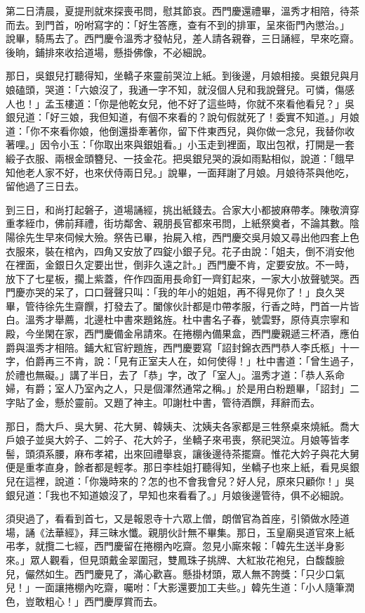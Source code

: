 第二日清晨，夏提刑就來探喪弔問，慰其節哀。西門慶還禮畢，溫秀才相陪，待茶而去。到門首，吩咐寫字的：「好生答應，查有不到的排軍，呈來衙門內懲治。」 說畢，騎馬去了。西門慶令溫秀才發帖兒，差人請各親眷，三日誦經，早來吃齋。後晌，鋪排來收拾道場，懸掛佛像，不必細說。

那日，吳銀兒打聽得知，坐轎子來靈前哭泣上紙。到後邊，月娘相接。吳銀兒與月娘磕頭，哭道：「六娘沒了，我通一字不知，就沒個人兒和我說聲兒。可憐，傷感人也！」孟玉樓道：「你是他乾女兒，他不好了這些時，你就不來看他看兒？」吳銀兒道：「好三娘，我但知道，有個不來看的？說句假就死了！委實不知道。」月娘道：「你不來看你娘，他倒還掛牽著你，留下件東西兒，與你做一念兒，我替你收著哩。」因令小玉：「你取出來與銀姐看。」小玉走到裡面，取出包袱，打開是一套緞子衣服、兩根金頭簪兒、一技金花。把吳銀兒哭的淚如雨點相似，說道：「餓早知他老人家不好，也來伏侍兩日兒。」說畢，一面拜謝了月娘。月娘待茶與他吃，留他過了三日去。

到三日，和尚打起磐子，道場誦經，挑出紙錢去。合家大小都披麻帶孝。陳敬濟穿重孝絰巾，佛前拜禮，街坊鄰舍、親朋長官都來弔問，上紙祭奠者，不論其數。陰陽徐先生早來伺候大殮。祭告已畢，抬屍入棺，西門慶交吳月娘又尋出他四套上色衣服來，裝在棺內，四角又安放了四錠小銀子兒。花子由說：「姐夫，倒不消安他在裡面，金銀日久定要出世，倒非久遠之計。」西門慶不肯，定要安放。不一時，放下了七星板，擱上紫蓋，仵作四面用長命釘一齊釘起來，一家大小放聲號哭。西門慶亦哭的呆了，口口聲聲只叫：「我的年小的姐姐，再不得見你了！」良久哭畢，管待徐先生齋饌，打發去了。闔傢伙計都是巾帶孝服，行香之時，門首一片皆白。溫秀才舉薦，北邊杜中書來題銘旌。杜中書名子春，號雲野，原侍真宗寧和殿，今坐閑在家，西門慶備金帛請來。在捲棚內備果盒，西門慶親遞三杯酒，應伯爵與溫秀才相陪。鋪大紅官紵題旌，西門慶要寫「詔封錦衣西門恭人李氏柩」十一字，伯爵再三不肯，說：「見有正室夫人在，如何使得！」杜中書道：「曾生過子，於禮也無礙。」講了半日，去了「恭」字，改了「室人」。溫秀才道：「恭人系命婦，有爵；室人乃室內之人，只是個渾然通常之稱。」於是用白粉題畢，「詔封」二字貼了金，懸於靈前。又題了神主。叩謝杜中書，管待酒饌，拜辭而去。

那日，喬大戶、吳大舅、花大舅、韓姨夫、沈姨夫各家都是三牲祭桌來燒紙。喬大戶娘子並吳大妗子、二妗子、花大妗子，坐轎子來弔喪，祭祀哭泣。月娘等皆孝髻，頭須系腰，麻布孝裙，出來回禮舉哀，讓後邊待茶擺齋。惟花大妗子與花大舅便是重孝直身，餘者都是輕孝。那日李桂姐打聽得知，坐轎子也來上紙，看見吳銀兒在這裡，說道：「你幾時來的？怎的也不會我會兒？好人兒，原來只顧你！」吳銀兒道：「我也不知道娘沒了，早知也來看看了。」月娘後邊管待，俱不必細說。

須臾過了，看看到首七，又是報恩寺十六眾上僧，朗僧官為首座，引領做水陸道場，誦《法華經》，拜三昧水懺。親朋伙計無不畢集。那日，玉皇廟吳道官來上紙弔孝，就攬二七經，西門慶留在捲棚內吃齋。忽見小廝來報：「韓先生送半身影來。」眾人觀看，但見頭戴金翠圍冠，雙鳳珠子挑牌、大紅妝花袍兒，白馥馥臉兒，儼然如生。西門慶見了，滿心歡喜。懸掛材頭，眾人無不誇獎：「只少口氣兒！」一面讓捲棚內吃齋，囑咐：「大影還要加工夫些。」韓先生道：「小人隨筆潤色，豈敢粗心！」西門慶厚賞而去。

